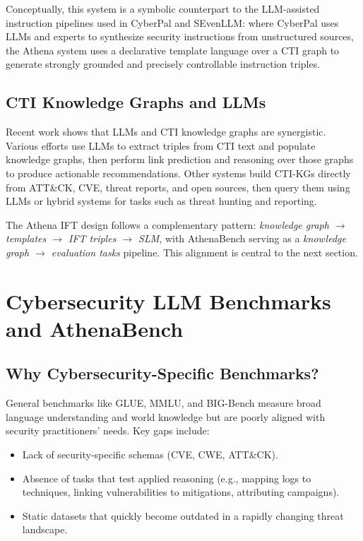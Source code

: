 \documentclass[sigconf]{acmart}
\begin{document}
Conceptually, this system is a symbolic counterpart to the LLM-assisted instruction pipelines used in CyberPal and SEvenLLM: where CyberPal uses LLMs and experts to synthesize security instructions from unstructured sources, the Athena system uses a declarative template language over a CTI graph to generate strongly grounded and precisely controllable instruction triples.

\subsection{CTI Knowledge Graphs and LLMs}

Recent work shows that LLMs and CTI knowledge graphs are synergistic. Various efforts use LLMs to extract triples from CTI text and populate knowledge graphs, then perform link prediction and reasoning over those graphs to produce actionable recommendations.\cite{fieblinger2024kg,zhang2023cyberkg,wu2022opencykg,yu2024ctikg,zhao2024kctiaa} Other systems build CTI-KGs directly from ATT\&CK, CVE, threat reports, and open sources, then query them using LLMs or hybrid systems for tasks such as threat hunting and reporting.

The Athena IFT design follows a complementary pattern: \emph{knowledge graph $\rightarrow$ templates $\rightarrow$ IFT triples $\rightarrow$ SLM}, with AthenaBench serving as a \emph{knowledge graph $\rightarrow$ evaluation tasks} pipeline. This alignment is central to the next section.

\section{Cybersecurity LLM Benchmarks and AthenaBench}
\label{sec:benchmarks}

\subsection{Why Cybersecurity-Specific Benchmarks?}

General benchmarks like GLUE, MMLU, and BIG-Bench measure broad language understanding and world knowledge but are poorly aligned with security practitioners' needs. Key gaps include:

\begin{itemize}
  \item Lack of security-specific schemas (CVE, CWE, ATT\&CK).
  \item Absence of tasks that test applied reasoning (e.g., mapping logs to techniques, linking vulnerabilities to mitigations, attributing campaigns).
  \item Static datasets that quickly become outdated in a rapidly changing threat landscape.
\end{itemize}
\end{document}
